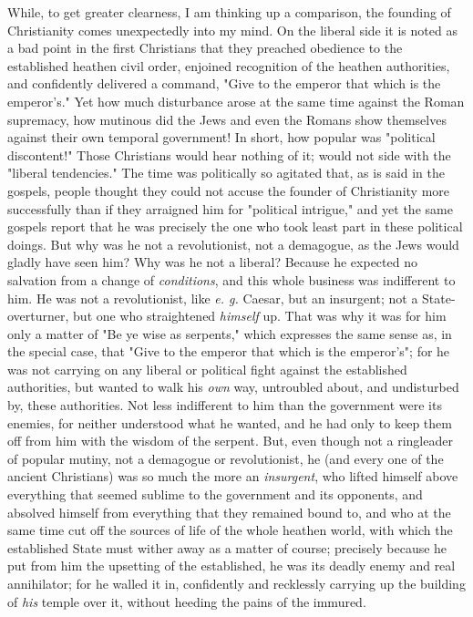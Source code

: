 \documentclass[a4paper]{book}
\begin{document}
While, to get greater clearness, I am thinking up a comparison, the founding 
of Christianity comes unexpectedly into my mind. On the liberal side it is 
noted as a bad point in the first Christians that they preached obedience to 
the established heathen civil order, enjoined recognition of the heathen 
authorities, and confidently delivered a command, "{}Give to the emperor that 
which is the emperor's."{} Yet how much disturbance arose at the same time 
against the Roman supremacy, how mutinous did the Jews and even the Romans 
show themselves against their own temporal government! In short, how popular 
was "{}political discontent!"{} Those Christians would hear nothing of it; 
would not side with the "{}liberal tendencies."{} The time was politically so 
agitated that, as is said in the gospels, people thought they could not accuse 
the founder of Christianity more successfully than if they arraigned him for 
"{}political intrigue,"{} and yet the same gospels report that he was 
precisely the one who took least part in these political doings. But why was 
he not a revolutionist, not a demagogue, as the Jews would gladly have seen 
him? Why was he not a liberal? Because he expected no salvation from a change 
of \textit{conditions}, and this whole business was indifferent to him. He was 
not a revolutionist, like \textit{e. g.} Caesar, but an insurgent; not a 
State-overturner, but one who straightened \textit{himself} up. That was why 
it was for him only a matter of "{}Be ye wise as serpents,"{} which expresses 
the same sense as, in the special case, that "{}Give to the emperor that which 
is the emperor's"{}; for he was not carrying on any liberal or political fight 
against the established authorities, but wanted to walk his \textit{own} way, 
untroubled about, and undisturbed by, these authorities. Not less indifferent 
to him than the government were its enemies, for neither understood what he 
wanted, and he had only to keep them off from him with the wisdom of the 
serpent. But, even though not a ringleader of popular mutiny, not a demagogue 
or revolutionist, he (and every one of the ancient Christians) was so much the 
more an \textit{insurgent}, who lifted himself above everything that seemed 
sublime to the government and its opponents, and absolved himself from 
everything that they remained bound to, and who at the same time cut off the 
sources of life of the whole heathen world, with which the established State 
must wither away as a matter of course; precisely because he put from him the 
upsetting of the established, he was its deadly enemy and real annihilator; 
for he walled it in, confidently and recklessly carrying up the building of 
\textit{his} temple over it, without heeding the pains of the immured.
\end{document}
